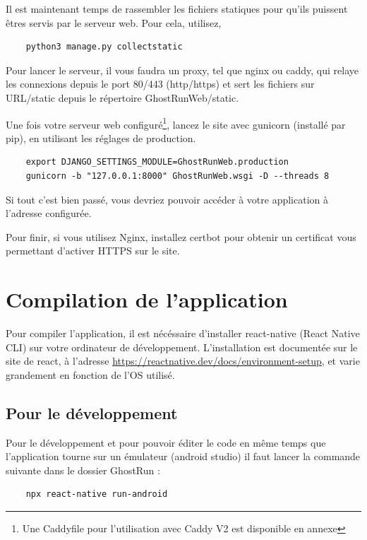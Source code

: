 Il est maintenant temps de rassembler les fichiers statiques pour qu'ils puissent êtres servis par le serveur web. Pour cela, utilisez,

\begin{verbatim}
    python3 manage.py collectstatic
\end{verbatim}

Pour lancer le serveur, il vous faudra un proxy, tel que nginx ou caddy, qui relaye les connexions depuis le port 80/443 (http/https) et sert les fichiers sur URL/static depuis le répertoire GhostRunWeb/static.

Une fois votre serveur web configuré\footnote{Une Caddyfile pour l'utilisation avec Caddy V2 est disponible en annexe}, lancez le site avec gunicorn (installé par pip), en utilisant les réglages de production.

\begin{verbatim}
    export DJANGO_SETTINGS_MODULE=GhostRunWeb.production
    gunicorn -b "127.0.0.1:8000" GhostRunWeb.wsgi -D --threads 8
\end{verbatim}

Si tout c'est bien passé, vous devriez pouvoir accéder à votre application à l'adresse configurée.

Pour finir, si vous utilisez Nginx, installez certbot pour obtenir un certificat vous permettant d'activer HTTPS sur le site.


\section{Compilation de l'application}

Pour compiler l'application, il est nécéssaire d'installer react-native (React Native CLI) sur votre ordinateur de développement. L'installation est documentée sur le site de react, à l'adresse \url{https://reactnative.dev/docs/environment-setup}, et varie grandement en fonction de l'OS utilisé.

\subsection{Pour le développement}

Pour le développement et pour pouvoir éditer le code en même temps que l'application tourne sur un émulateur (android studio) il faut lancer la commande suivante dans le dossier GhostRun :

\begin{verbatim}
    npx react-native run-android
\end{verbatim}

